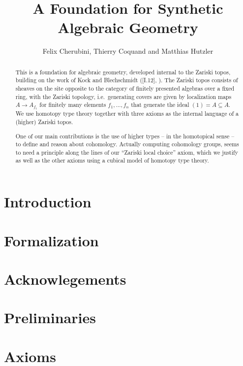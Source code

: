 \documentclass{zariski}
\title{A Foundation for Synthetic Algebraic Geometry}
\author{Felix Cherubini, Thierry Coquand and Matthias Hutzler}
\begin{document}
\maketitle

\begin{abstract}
  This is a foundation for algebraic geometry, developed internal to the Zariski topos, building on the work of Kock and Blechschmidt (\cite{kock-sdg}[I.12], \cite{ingo-thesis}).
  The Zariski topos consists of sheaves on the site opposite to the category of finitely presented algebras over a fixed ring, with the Zariski topology, i.e.\ generating covers are given by localization maps $A\to A_{f_1}$ for finitely many elements $f_1,\dots,f_n$ that generate the ideal $(1)=A\subseteq A$.
  We use homotopy type theory together with three axioms as the internal language of a (higher) Zariski topos.

  One of our main contributions is the use of higher types -- in the homotopical sense -- to define and reason about cohomology.
  Actually computing cohomology groups, seems to need a principle along the lines of our ``Zariski local choice'' axiom,
  which we justify as well as the other axioms using a cubical model of homotopy type theory.
\end{abstract}

\tableofcontents

\section*{Introduction}


\section*{Formalization}


\section*{Acknowlegements}


\section{Preliminaries}


\section{Axioms}

\end{document}
